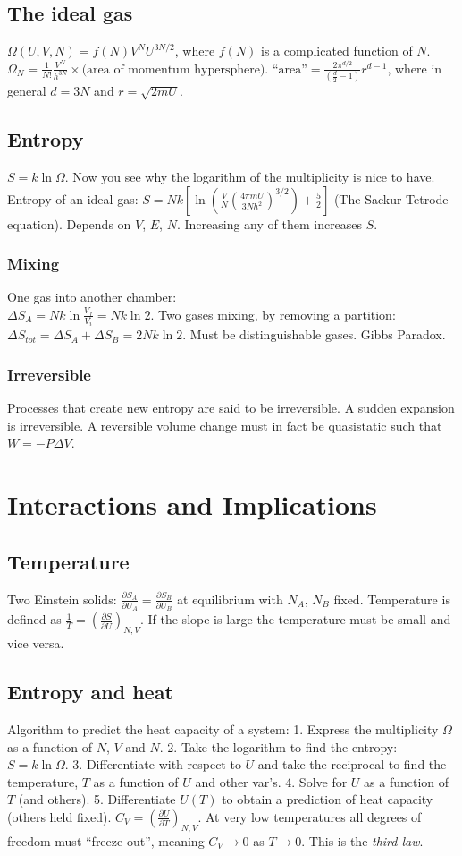 \documentclass[11pt,twocolumn]{amsart}
\begin{document}
\subsection{The ideal gas}
$\Omega(U,V,N) = f(N)V^NU^{3N/2}$, where $f(N)$ is a complicated function of $N$. \\ $\Omega_N = \frac{1}{N!}\frac{V^N}{h^{3N}}\times\text{(area of momentum hypersphere)}$. $\text{``area''} = \frac{2\pi^{d/2}}{(\frac{d}{2}-1)}r^{d-1}$, where  in general $d=3N$ and $r = \sqrt{2mU}$.
\subsection{Entropy}
$S = k\ln\Omega$. Now you see why the logarithm of the multiplicity is nice to have. Entropy of an ideal gas: $S = Nk \left[\ln\left(\frac{V}{N}\left(\frac{4\pi mU}{3Nh^2}\right)^{3/2} \right) + \frac{5}{2} \right]$ (The Sackur-Tetrode equation). Depends on $V$, $E$, $N$. Increasing any of them increases $S$. 
\subsubsection{Mixing} One gas into another chamber:\\ $\Delta S_A = Nk\ln\frac{V_f}{V_i}=Nk\ln 2$. Two gases mixing, by removing a partition: $\Delta S_{tot} = \Delta S_A + \Delta S_B = 2Nk \ln 2$. Must be distinguishable gases. Gibbs Paradox.
\subsubsection{Irreversible} Processes that create new entropy are said to be irreversible. A sudden expansion is irreversible. A reversible volume change must in fact be quasistatic such that $W = - P\Delta V $.

\section{Interactions and Implications}
\subsection{Temperature}
Two Einstein solids: $\frac{\partial S_A}{\partial U_A} = \frac{\partial S_B}{\partial U_B}$ at equilibrium with $N_A$, $N_B$ fixed. Temperature is defined as $\frac{1}{T} = \left(\frac{\partial S}{\partial U} \right)_{N,V}$. If the slope is large the temperature must be small and vice versa.
\subsection{Entropy and heat}
Algorithm to predict the heat capacity of a system: 1. Express the multiplicity $\Omega$ as a function of $N$, $V$ and $N$. 2. Take the logarithm to find the entropy: $S=k\ln\Omega$. 3. Differentiate with respect to $U$ and take the reciprocal to find the temperature, $T$ as a function of $U$ and other var's. 4. Solve for $U$ as a function of $T$ (and others). 5. Differentiate $U(T)$ to obtain a prediction of heat capacity (others held fixed). $C_V = \left(\frac{\partial U}{\partial T} \right)_{N,V}$. At very low temperatures all degrees of freedom must ``freeze out'', meaning $C_V \rightarrow 0$ as $T \rightarrow 0$. This is the \emph{third law}.
\end{document}
